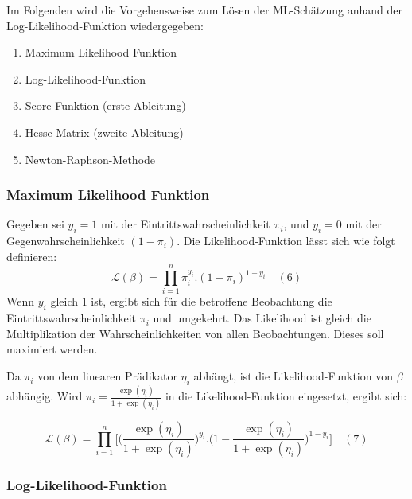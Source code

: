 \documentclass[12pt,]{article}
\providecommand{\tightlist}{%
  \setlength{\itemsep}{0pt}\setlength{\parskip}{0pt}}
\begin{document}
Im Folgenden wird die Vorgehensweise zum Lösen der ML-Schätzung anhand
der Log-Likelihood-Funktion wiedergegeben:

\begin{enumerate}
\def\labelenumi{\arabic{enumi}.}
\tightlist
\item
  Maximum Likelihood Funktion
\item
  Log-Likelihood-Funktion
\item
  Score-Funktion (erste Ableitung)
\item
  Hesse Matrix (zweite Ableitung)
\item
  Newton-Raphson-Methode
\end{enumerate}

\subsubsection{Maximum Likelihood
Funktion}\label{maximum-likelihood-funktion}

Gegeben sei \(y_i = 1\) mit der Eintrittswahrscheinlichkeit \(\pi_i\),
und \(y_i = 0\) mit der Gegenwahrscheinlichkeit \((1-\pi_i)\). Die
Likelihood-Funktion lässt sich wie folgt definieren: \[
\mathcal{L}(\beta) = {\prod_{i=1}^{n} \pi_i^{y_i}.(1-\pi_i)^{1-y_i}} \quad (6)
\] Wenn \(y_i\) gleich 1 ist, ergibt sich für die betroffene Beobachtung
die Eintrittswahrscheinlichkeit \(\pi_i\) und umgekehrt. Das Likelihood
ist gleich die Multiplikation der Wahrscheinlichkeiten von allen
Beobachtungen. Dieses soll maximiert werden.

Da \(\pi_i\) von dem linearen Prädikator \(\eta_i\) abhängt, ist die
Likelihood-Funktion von \(\beta\) abhängig. Wird
\(\pi_i = \frac{\exp(\eta_i)}{1 + \exp(\eta_i)}\) in die
Likelihood-Funktion eingesetzt, ergibt sich:

\[
\mathcal{L}(\beta) = {\prod_{i=1}^{n} \Bigg[ \Big( \frac{\exp(\eta_i)}{1 + \exp(\eta_i)} \Big)^{y_i}.\Big(1-\frac{\exp(\eta_i)}{1 + \exp(\eta_i)}\Big)^{1-y_i}}\Bigg] \quad (7)
\]

\subsubsection{Log-Likelihood-Funktion}\label{log-likelihood-funktion}
\end{document}
